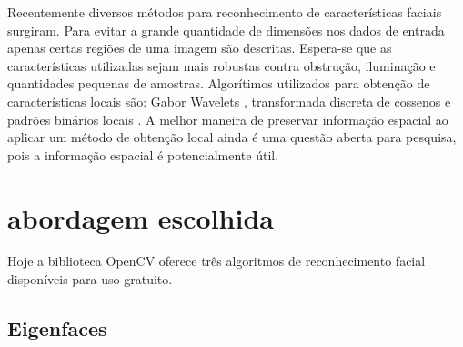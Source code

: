 Recentemente diversos métodos para reconhecimento de características faciais surgiram. Para evitar a grande quantidade de dimensões nos dados de entrada apenas certas regiões de uma imagem são descritas. Espera-se que as características utilizadas sejam mais robustas contra obstrução, iluminação e quantidades pequenas de amostras. Algorítimos utilizados para obtenção de características locais são: Gabor Wavelets \cite{wiskott1997face}, transformada discreta de cossenos \cite{messer2006performance} e padrões binários locais \cite{binaryface}. A melhor maneira de preservar informação espacial ao aplicar um método de obtenção local ainda é uma questão aberta para pesquisa, pois a informação espacial é potencialmente útil.

\section*{abordagem escolhida}

Hoje a biblioteca OpenCV oferece três algoritmos de reconhecimento facial disponíveis para uso gratuito. 
\subsection*{Eigenfaces} %
\label{sub:eigenfaces}

